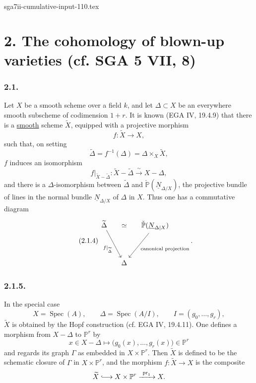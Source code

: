 \begin{filecontents*}{sga7ii-cumulative-input-110.tex}
\section*{2. The cohomology of blown-up varieties (cf. SGA 5 VII, 8)}

\subsubsection*{2.1.}
Let $X$ be a smooth scheme over a field $k$, and let
$\Delta\subset X$ be an everywhere smooth subscheme of codimension $1+r$.
It is known (EGA IV, 19.4.9) that there is a \underline{smooth} scheme
$\widetilde X$, equipped with a projective morphism
\begin{equation}\tag{2.1.1}
f:\widetilde X\longrightarrow X,
\end{equation}
such that, on setting
\begin{equation}\tag{2.1.2}
\widetilde\Delta=f^{-1}(\Delta)
=\Delta\times_X\widetilde X,
\end{equation}
$f$ induces an isomorphism
\begin{equation}\tag{2.1.3}
f|_{\widetilde X-\widetilde\Delta}:
\widetilde X-\widetilde\Delta
\xrightarrow{\ \sim\ }X-\Delta,
\end{equation}
and there is a $\Delta$-isomorphism between $\widetilde\Delta$ and
$\check{\mathbb P}(\underline N_{\Delta/X})$, the projective bundle of
lines in the normal bundle $\underline N_{\Delta/X}$ of $\Delta$ in $X$.
Thus one has a commutative diagram
\begin{equation}\tag{2.1.4}
\begin{tikzcd}[row sep=huge,column sep=small]
\widetilde\Delta
  \arrow[rd,"f|_{\widetilde\Delta}"']
  & \simeq &
\check{\mathbb P}(\underline N_{\Delta|X})
  \arrow[ld,"\text{canonical projection}"]\\
{} & \Delta & {}
\end{tikzcd}.
\end{equation}

\subsubsection*{2.1.5.}
In the special case
\[
X=\operatorname{Spec}(A),\qquad
\Delta=\operatorname{Spec}(A/I),\qquad
I=(g_0,\ldots,g_r),
\]
$\widetilde X$ is obtained by the Hopf construction (cf. EGA IV, 19.4.11).
One defines a morphism from $X-\Delta$ to $\mathbb P^r$ by
\[
x\in X-\Delta\longmapsto
\bigl(g_0(x),\ldots,g_r(x)\bigr)\in\mathbb P^r
\]
and regards its graph $\Gamma$ as embedded in $X\times\mathbb P^r$. Then
$\widetilde X$ is defined to be the schematic closure of $\Gamma$ in
$X\times\mathbb P^r$, and the morphism
$f:\widetilde X\longrightarrow X$ is the composite
\[
\widetilde X\lhook\joinrel\longrightarrow
X\times\mathbb P^r\xrightarrow{\ \operatorname{pr}_1\ }X.
\]


\end{filecontents*}
